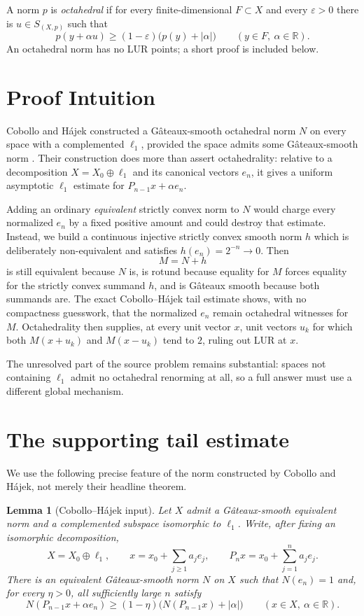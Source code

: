 \documentclass[11pt]{article}
\newtheorem{lemma}[theorem]{Lemma}
\newcommand{\R}{\mathbb R}
\newcommand{\eps}{\varepsilon}
\begin{document}
A norm $p$ is \emph{octahedral} if for every finite-dimensional
$F\subset X$ and every $\eps>0$ there is $u\in S_{(X,p)}$ such that
\[
 p(y+\alpha u)\ge (1-\eps)\bigl(p(y)+|\alpha|\bigr)
 \qquad(y\in F,\ \alpha\in\R).
\]
An octahedral norm has no LUR points; a short proof is included below.

\section{Proof Intuition}

Cobollo and H\'ajek constructed a G\^ateaux-smooth octahedral norm $N$ on
every space with a complemented $\ell_1$, provided the space admits some
G\^ateaux-smooth norm \cite{CH}.  Their construction does more than assert
octahedrality: relative to a decomposition
$X=X_0\oplus\ell_1$ and its canonical vectors $e_n$, it gives a uniform
asymptotic $\ell_1$ estimate for $P_{n-1}x+\alpha e_n$.

Adding an ordinary \emph{equivalent} strictly convex norm to $N$ would charge
every normalized $e_n$ by a fixed positive amount and could destroy that
estimate.  Instead, we build a continuous injective strictly convex smooth
norm $h$ which is deliberately non-equivalent and satisfies
$h(e_n)=2^{-n}\to0$.  Then
\[
                         M=N+h
\]
is still equivalent because $N$ is, is rotund because equality for $M$ forces
equality for the strictly convex summand $h$, and is G\^ateaux smooth because
both summands are.  The exact Cobollo--H\'ajek tail estimate shows, with no
compactness guesswork, that the normalized $e_n$ remain octahedral witnesses
for $M$.  Octahedrality then supplies, at every unit vector $x$, unit vectors
$u_k$ for which both $M(x+u_k)$ and $M(x-u_k)$ tend to $2$, ruling out LUR at
$x$.

The unresolved part of the source problem remains substantial: spaces not
containing $\ell_1$ admit no octahedral renorming at all, so a full answer must
use a different global mechanism.

\section{The supporting tail estimate}

We use the following precise feature of the norm constructed by Cobollo and
H\'ajek, not merely their headline theorem.

\begin{lemma}[Cobollo--H\'ajek input]\label{lem:CH}
Let $X$ admit a G\^ateaux-smooth equivalent norm and a complemented subspace
isomorphic to $\ell_1$.  Write, after fixing an isomorphic decomposition,
\[
 X=X_0\oplus\ell_1,
 \qquad x=x_0+\sum_{j\ge1}a_j e_j,
 \qquad
 P_nx=x_0+\sum_{j=1}^n a_j e_j.
\]
There is an equivalent G\^ateaux-smooth norm $N$ on $X$ such that
$N(e_n)=1$ and, for every $\eta>0$, all sufficiently large $n$ satisfy
\begin{equation}\label{eq:CHtail}
 N(P_{n-1}x+\alpha e_n)
 \ge (1-\eta)\bigl(N(P_{n-1}x)+|\alpha|\bigr)
 \qquad(x\in X,\ \alpha\in\R).
\end{equation}
\end{lemma}
\end{document}
